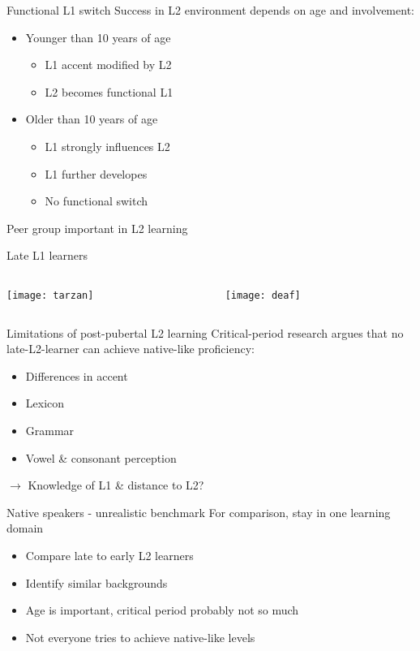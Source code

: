 \documentclass{beamer}
\begin{document}
\begin{frame}{Functional L1 switch}
	Success in L2 environment depends on age and involvement:
	\begin{itemize}
		\item Younger than 10 years of age
		\pause
		\begin{itemize}
			\item L1 accent modified by L2
			\item L2 becomes functional L1
		\end{itemize}
		\pause
		\item Older than 10 years of age
		\pause
		\begin{itemize}
			\item L1 strongly influences L2
			\item L1 further developes
			\item No functional switch
		\end{itemize}
	\end{itemize}
	\pause
	\vspace{0.25cm}
	Peer group important in L2 learning
\end{frame}

\begin{frame}{Late L1 learners}
	\begin{columns}
		\begin{column}{4cm}
			\texttt{[image: tarzan]}
		\end{column}
		\begin{column}{4cm}
			\texttt{[image: deaf]}
		\end{column}
	\end{columns}
\end{frame}

\begin{frame}{Limitations of post-pubertal L2 learning}
	Critical-period research argues that no late-L2-learner can achieve native-like proficiency:
	\pause
	\begin{itemize}
		\item Differences in accent
		\pause
		\item Lexicon
		\pause
		\item Grammar
		\pause
		\item Vowel \& consonant perception
	\end{itemize}
	\pause
	\vspace{0.25cm}
	$\rightarrow$ Knowledge of L1 \& distance to L2?
\end{frame}

\begin{frame}{Native speakers - unrealistic benchmark}
	For comparison, stay in one learning domain
	\pause
	\begin{itemize}
		\item Compare late to early L2 learners
		\pause
		\item Identify similar backgrounds
		\pause
		\item Age is important, critical period probably not so much
		\pause
		\item Not everyone tries to achieve native-like levels
	\end{itemize}
\end{frame}
\end{document}
